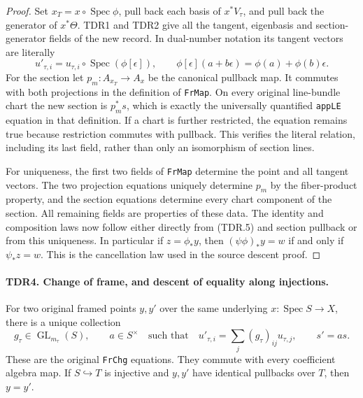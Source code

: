 \documentclass[11pt,a4paper]{article}
\numberwithin{equation}{section}
\theoremstyle{remark}\newtheorem{remark}[theorem]{Remark}
\begin{document}
\begin{proof}
Set \(x_T=x\circ\operatorname{Spec}\phi\), pull back each
basis of \(x^*V_\tau\), and pull back the generator of
\(x^*\Theta\).  TDR1 and TDR2 give all the tangent, eigenbasis
and section-generator fields of the new record.  In dual-number
notation its tangent vectors are literally
\[
 u'_{\tau,i}
   =u_{\tau,i}\circ\operatorname{Spec}(\phi[\epsilon]),
 \qquad
 \phi[\epsilon](a+b\epsilon)=\phi(a)+\phi(b)\epsilon .       \tag{TDR.5}
\]
For the section let \(p_m:A_{x_T}\to A_x\) be the canonical
pullback map.  It commutes with both projections in the definition
of \texttt{Fr\allowbreak Map}.  On every original line-bundle chart the new
section is \(p_m^*s\), which is exactly the universally quantified
\texttt{app\allowbreak LE} equation in that definition.  If a chart is further
restricted, the equation remains true because restriction commutes
with pullback.  This verifies the literal relation, including its
last field, rather than only an isomorphism of section lines.

For uniqueness, the first two fields of \texttt{Fr\allowbreak Map} determine
the point and all tangent vectors.  The two projection equations
uniquely determine \(p_m\) by the fiber-product property, and the
section equations determine every chart component of the section.
All remaining fields are properties of these data.  The identity
and composition laws now follow either directly from (TDR.5) and
section pullback or from this uniqueness.  In particular if
\(z=\phi_*y\), then \((\psi\phi)_*y=w\) if and only if
\(\psi_*z=w\).  This is the cancellation law used in the source
descent proof.
\end{proof}

\paragraph{TDR4. Change of frame, and descent of equality along injections.}
\label{claim:TDR4}
For two original framed points \(y,y'\) over the same underlying
\(x:\operatorname{Spec}S\to X\), there is a unique collection
\[
 g_\tau\in\operatorname{GL}_{m_\tau}(S),\qquad a\in S^\times
 \quad\text{such that}\quad
 u'_{\tau,i}=\sum_j(g_\tau)_{ij}u_{\tau,j},\qquad s'=a s.
                                                               \tag{TDR.6}
\]
These are the original \texttt{Fr\allowbreak Chg} equations.  They commute
with every coefficient algebra map.  If \(S\hookrightarrow T\)
is injective and \(y,y'\) have identical pullbacks over \(T\),
then \(y=y'\).
\end{document}
